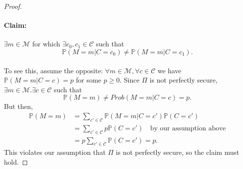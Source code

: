 \documentclass{article}
\theoremstyle{definition}
\newcommand{\M}{\mathcal{M}}
\renewcommand{\C}{\mathcal{C}}
\newcommand{\Prob}{\mathbb{P}}
\begin{document}
\begin{proof}
  \paragraph{Claim:} $\exists m \in \M$ for which $\exists c_0, c_1 \in \C$ such
  that
  \[
    \Prob(M = m | C = c_0) \neq \Prob(M = m | C = c_1).
  \]
  \paragraph{} To see this, assume the opposite: $\forall m \in \M, \forall c
  \in \C$ we have $\Prob(M = m | C = c) = p$ for some $p \geq 0$. Since $\Pi$ is
  not perfectly secure, $\exists m \in \M. \exists c \in \C$ such that
  \[
    \Prob(M = m) \neq Prob(M = m | C = c) = p.
  \]
  But then,
  \begin{align*}
    \Prob(M = m) &= \sum_{c' \in \C} \Prob(M = m | C = c')\Prob(C = c') \\
                 &= \sum_{c' \in \C} p\Prob(C = c')\quad\text{by our assumption above} \\
   &= p\sum_{c' \in \C} \Prob(C = c') = p.
  \end{align*}
  This violates our assumption that $\Pi$ is not perfectly secure, so the claim
  must hold.

\end{proof}
\end{document}

